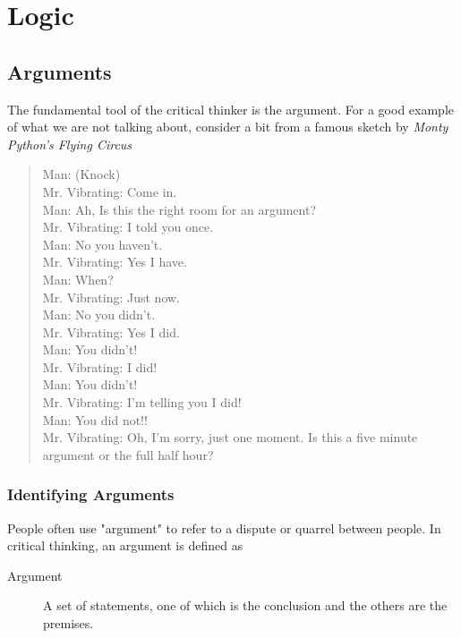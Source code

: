 \part{Logic}


\chapter{Arguments}
\label{chap:arguments}

The fundamental tool of the critical thinker is the argument. For a good example of what we are not talking about, consider a bit from a famous sketch by \emph{Monty Python's Flying Circus}

\begin{quote}
Man: (Knock)\\
Mr. Vibrating: Come in.\\
Man: Ah, Is this the right room for an argument?\\
Mr. Vibrating: I told you once.\\
Man: No you haven't.\\
Mr. Vibrating: Yes I have.\\
Man: When?\\
Mr. Vibrating: Just now.\\
Man: No you didn't.\\
Mr. Vibrating: Yes I did.\\
Man: You didn't!\\
Mr. Vibrating: I did!\\
Man: You didn't!\\
Mr. Vibrating: I'm telling you I did!\\
Man: You did not!!\\
Mr. Vibrating: Oh, I'm sorry, just one moment. Is this a five minute argument or the full half hour?\\
\end{quote}

\section{Identifying Arguments}
\label{sec:ident-argum}

People often use "argument" to refer to a dispute or quarrel between
people. In critical thinking, an argument is defined as

\begin{description}
\item[Argument] A set of statements, one of which is the conclusion and the others are the premises.
\end{description}



